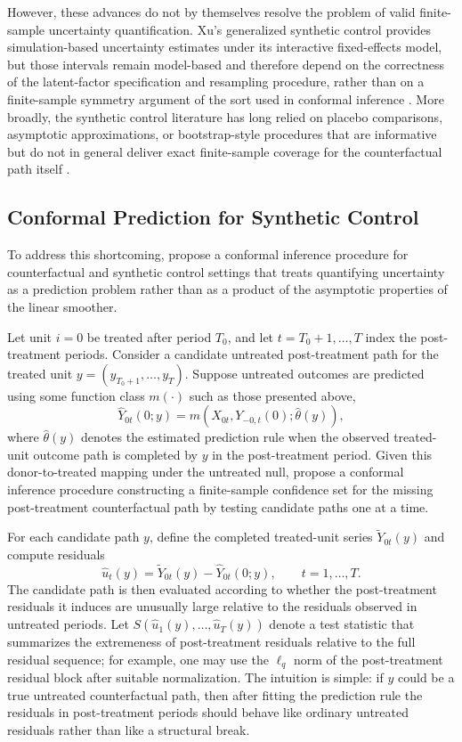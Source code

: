 \documentclass{article}
\begin{document}
However, these advances do not by themselves resolve the problem of valid finite-sample uncertainty quantification. Xu’s generalized synthetic control provides simulation-based uncertainty estimates under its interactive fixed-effects model, but those intervals remain model-based and therefore depend on the correctness of the latent-factor specification and resampling procedure, rather than on a finite-sample symmetry argument of the sort used in conformal inference \citep{xu_generalized_2017}. More broadly, the synthetic control literature has long relied on placebo comparisons, asymptotic approximations, or bootstrap-style procedures that are informative but do not in general deliver exact finite-sample coverage for the counterfactual path itself \citep{xu_generalized_2017,Chernozhukov2021}.

\subsection{Conformal Prediction for Synthetic Control}

To address this shortcoming, \citet{Chernozhukov2021} propose a conformal inference procedure for counterfactual and synthetic control settings that treats quantifying uncertainty as a prediction problem rather than as a product of the asymptotic properties of the linear smoother.

Let unit $i=0$ be treated after period $T_0$, and let $t=T_0+1,\dots,T$ index the post-treatment periods. Consider a candidate untreated post-treatment path for the treated unit $y=(y_{T_0+1},\dots,y_T)$. Suppose untreated outcomes are predicted using some function class $m(\cdot)$ such as those presented above,
\[
\hat Y_{0t}(0;y)
=
m(X_{0t},Y_{-0,t}(0);\hat\theta(y)),
\]
where $\hat\theta(y)$ denotes the estimated prediction rule when the observed treated-unit outcome path is completed by $y$ in the post-treatment period. Given this donor-to-treated mapping under the untreated null, \citet{Chernozhukov2021} propose a conformal inference procedure constructing a finite-sample confidence set for the missing post-treatment counterfactual path by testing candidate paths one at a time.

For each candidate path $y$, define the completed treated-unit series $\tilde Y_{0t}(y)$ and compute residuals
\[
\hat u_t(y)=\tilde Y_{0t}(y)-\hat Y_{0t}(0;y), \qquad t=1,\dots,T.
\]
The candidate path is then evaluated according to whether the post-treatment residuals it induces are unusually large relative to the residuals observed in untreated periods. Let $S(\hat u_1(y),\dots,\hat u_T(y))$ denote a test statistic that summarizes the extremeness of post-treatment residuals relative to the full residual sequence; for example, one may use the $\ell_q$ norm of the post-treatment residual block after suitable normalization. The intuition is simple: if $y$ could be a true untreated counterfactual path, then after fitting the prediction rule the residuals in post-treatment periods should behave like ordinary untreated residuals rather than like a structural break.
\end{document}
